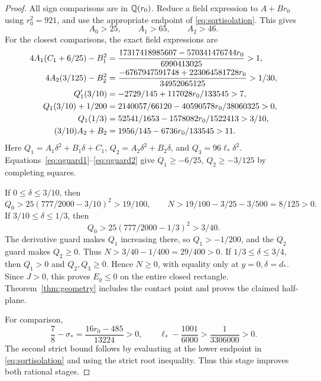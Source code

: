\begin{proof}
All sign comparisons are in $\mathbb Q(r_0)$. Reduce a field expression to $A+Br_0$ using $r_0^2=921$, and use the appropriate endpoint of \eqref{eq:sqrtisolation}. This gives
\[
 A_0>25,\qquad A_1>65,\qquad A_2>46.
\]
For the closest comparisons, the exact field expressions are
\begin{align}
 4A_1(C_1+6/25)-B_1^2
 &=\frac{17317418985607-570341476744r_0}{6990413025}>1,\label{eq:qguard1}\\
 4A_2(3/125)-B_2^2
 &=\frac{-6767947591748+223064581728r_0}{34952065125}>1/30,\label{eq:qguard2}\\
 Q_1'(3/10)&=-2729/145+117028r_0/133545>7,\notag\\
 Q_1(3/10)+1/200&=2140057/66120-40590578r_0/38060325>0,\notag\\
 Q_1(1/3)&=52541/1653-1578082r_0/1522413>3/10,\notag\\
 (3/10)A_2+B_2&=1956/145-6736r_0/133545>11.\notag
\end{align}
Here $Q_1=A_1\delta^2+B_1\delta+C_1$, $Q_2=A_2\delta^2+B_2\delta$, and $Q_3=96\ell_*\delta^2$. Equations~\eqref{eq:qguard1}--\eqref{eq:qguard2} give $Q_1\ge-6/25$, $Q_2\ge-3/125$ by completing squares.

If $0\le\delta\le3/10$, then
\[
 Q_0>25(777/2000-3/10)^2>19/100,\qquad
 N>19/100-3/25-3/500=8/125>0.
\]
If $3/10\le\delta\le1/3$, then
\[
 Q_0>25(777/2000-1/3)^2>3/40.
\]
The derivative guard makes $Q_1$ increasing there, so $Q_1>-1/200$, and the $Q_2$ guard makes $Q_2\ge0$. Thus $N>3/40-1/400=29/400>0$.
If $1/3\le\delta\le3/4$, then $Q_1>0$ and $Q_2,Q_3\ge0$. Hence $N\ge0$, with equality only at $y=0,\delta=d_*$. Since $J>0$, this proves $E_g\le0$ on the entire closed rectangle. Theorem~\ref{thm:geometry} includes the contact point and proves the claimed half-plane.

For comparison,
\[
 \frac78-\sigma_*=\frac{16r_0-485}{13224}>0,\qquad
 \ell_*-\frac{1001}{6000}>\frac1{3306000}>0.
\]
The second strict bound follows by evaluating at the lower endpoint in \eqref{eq:sqrtisolation} and using the strict root inequality. Thus this stage improves both rational stages.
\end{proof}
